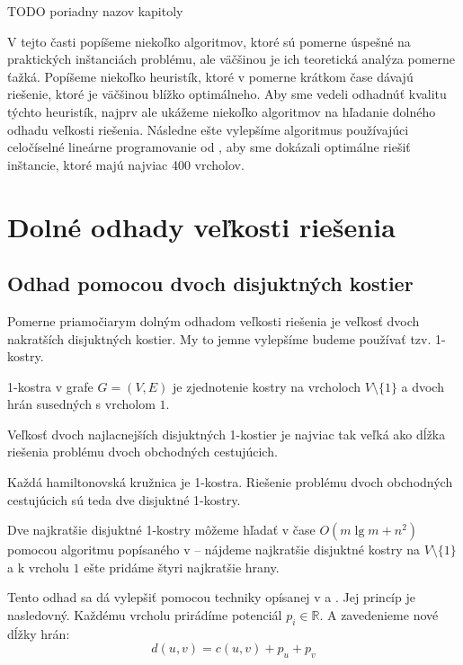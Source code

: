 TODO poriadny nazov kapitoly

V tejto časti popíšeme niekoľko algoritmov, ktoré sú pomerne úspešné
na praktických inštanciách problému, ale väčšinou je ich teoretická
analýza pomerne ťažká. Popíšeme niekoľko heuristík, ktoré v pomerne krátkom čase
dávajú riešenie, ktoré je väčšinou blížko optimálneho. Aby sme vedeli odhadnúť
kvalitu týchto heuristík, najprv ale ukážeme niekoľko algoritmov na hľadanie dolného odhadu
veľkosti riešenia. Následne ešte vylepšíme algoritmus používajúci
celočíselné lineárne programovanie od \cite{duchenne}, aby
sme dokázali optimálne riešiť inštancie, ktoré majú najviac 400 vrcholov.

\section{Dolné odhady veľkosti riešenia}

\subsection{Odhad pomocou dvoch disjuktných kostier}

Pomerne priamočiarym dolným odhadom veľkosti riešenia je veľkosť
dvoch nakratších disjuktných kostier. My to jemne vylepšíme budeme používať
tzv. 1-kostry.

\begin{definicia}
1-kostra v grafe $G=(V, E)$ je zjednotenie kostry na vrcholoch $V \setminus \{1\}$
a dvoch hrán susedných s vrcholom $1$. 
\end{definicia}

\begin{lema}
Veľkosť dvoch najlacnejších disjuktných 1-kostier je najviac tak veľká ako dĺžka
riešenia problému dvoch obchodných cestujúcich.
\end{lema}

\begin{dokaz}
Každá hamiltonovská kružnica je 1-kostra. Riešenie problému dvoch obchodných cestujúcich
sú teda dve disjuktné 1-kostry.
\end{dokaz}

Dve najkratšie disjuktné 1-kostry môžeme hľadať v čase $O(m \lg m + n^2)$ pomocou algoritmu popísaného v
\cite{spanning2} -- nájdeme najkratšie disjuktné kostry na $V \setminus \{1\}$ a k vrcholu $1$ ešte
pridáme štyri najkratšie hrany.

Tento odhad sa dá vylepšiť pomocou techniky opísanej v \cite{heldtsp} a \cite{lower1}.
Jej princíp je nasledovný. Každému vrcholu prirádíme potenciál 
$p_i \in \mathbb{R}$.
A zavedenieme nové dĺžky hrán:
$$d(u, v) = c(u, v) + p_u + p_v$$

